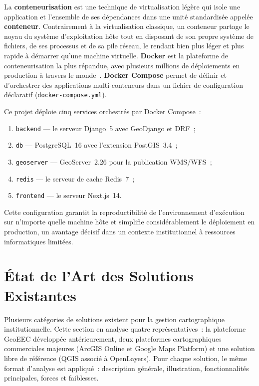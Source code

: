 \documentclass[12pt, a4paper]{report}
\newcommand{\kw}[1]{\textbf{#1}}
\begin{document}
La \kw{conteneurisation} est une technique de virtualisation légère qui isole une
application et l'ensemble de ses dépendances dans une unité standardisée appelée
\textbf{conteneur}. Contrairement à la virtualisation classique, un conteneur
partage le noyau du système d'exploitation hôte tout en disposant de son propre
système de fichiers, de ses processus et de sa pile réseau, le rendant bien plus
léger et plus rapide à démarrer qu'une machine virtuelle. \kw{Docker} est la
plateforme de conteneurisation la plus répandue, avec plusieurs millions de
déploiements en production à travers le monde~\cite{docker2024}.
\kw{Docker Compose} permet de définir et d'orchestrer des applications
multi-conteneurs dans un fichier de configuration déclaratif
(\texttt{docker-compose.yml}).

Ce projet déploie cinq services orchestrés par Docker Compose~:
\begin{enumerate}[itemsep=2pt, topsep=4pt, leftmargin=1.5cm]
  \item \texttt{backend} --- le serveur Django~5 avec GeoDjango et DRF~;
  \item \texttt{db} --- PostgreSQL~16 avec l'extension PostGIS~3.4~;
  \item \texttt{geoserver} --- GeoServer~2.26 pour la publication WMS/WFS~;
  \item \texttt{redis} --- le serveur de cache Redis~7~;
  \item \texttt{frontend} --- le serveur Next.js~14.
\end{enumerate}

Cette configuration garantit la reproductibilité de l'environnement d'exécution
sur n'importe quelle machine hôte et simplifie considérablement le déploiement
en production, un avantage décisif dans un contexte institutionnel à ressources
informatiques limitées.

\section{État de l'Art des Solutions Existantes}
\label{sec:etat-art}

Plusieurs catégories de solutions existent pour la gestion cartographique
institutionnelle. Cette section en analyse quatre représentatives~: la plateforme
GeoEEC développée antérieurement, deux plateformes cartographiques commerciales
majeures (ArcGIS Online et Google Maps Platform) et une solution libre de
référence (QGIS associé à OpenLayers). Pour chaque solution, le même format
d'analyse est appliqué~: description générale, illustration, fonctionnalités
principales, forces et faiblesses.
\end{document}
